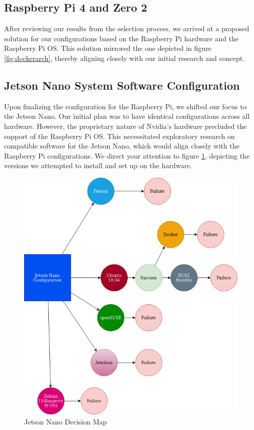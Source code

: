 \subsection{Raspberry Pi 4 and Zero 2}
After reviewing our results from the selection process, we arrived at a proposed solution for our configurations based on the Raspberry Pi hardware and the Raspberry Pi OS. This solution mirrored the one depicted in figure \ref{fig:dockerarch}, thereby aligning closely with our initial research and concept.\\

\subsection{Jetson Nano System Software Configuration}

Upon finalizing the configuration for the Raspberry Pi, we shifted our focus to the Jetson Nano. Our initial plan was to have identical configurations across all hardware. However, the proprietary nature of Nvidia's hardware precluded the support of the Raspberry Pi OS.
This necessitated exploratory research on compatible software for the Jetson Nano, which would align closely with the Raspberry Pi configurations. We direct your attention to figure \ref{fig:jetsonnanodesc}, depicting the versions we attempted to install and set up on the hardware.\\

\begin{figure}[H]
    \centering
    \includegraphics[scale=0.5]{fig/jetson_nano_os.png}
    \caption{Jetson Nano Decision Map}
    \label{fig:jetsonnanodesc}
\end{figure}

